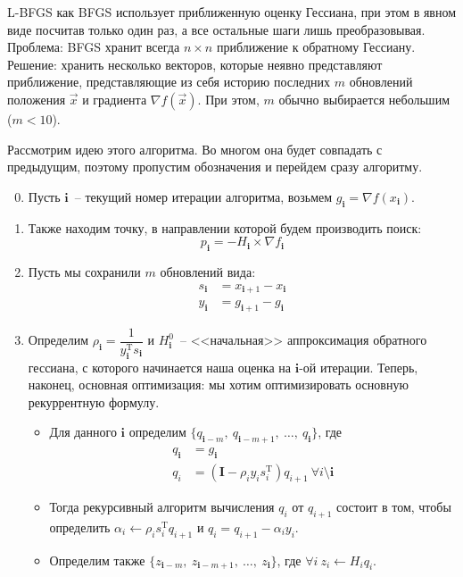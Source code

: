 \documentclass[12pt, a4paper, oneside, final]{article}
\begin{document}
	L-BFGS как BFGS использует приближенную оценку Гессиана, при этом в явном виде посчитав только один раз, а все остальные шаги лишь преобразовывая.
	Проблема: BFGS хранит всегда $n \times n$ приближение к обратному Гессиану.
	Решение: хранить несколько векторов, которые неявно представляют приближение, представляющие из себя историю последних $m$ обновлений положения $\vec{x}$ и градиента $\nabla{f(\vec{x})}$.
	При этом, $m$ обычно выбирается небольшим ($m < 10$).

	Рассмотрим идею этого алгоритма.
	Во многом она будет совпадать с предыдущим, поэтому пропустим обозначения и перейдем сразу алгоритму.
	\begin{enumerate}[1)]
		\setcounter{enumi}{-1}
		\item Пусть $\mathbf{i}$~-- текущий номер итерации алгоритма, возьмем $g_{\mathbf{i}} = \nabla{f(x_{\mathbf{i}})}$.
		\item Также находим точку, в направлении которой будем производить поиск:
		\[
			p_{\mathbf{i}} = -H_{\mathbf{i}} \times \nabla{f_{\mathbf{i}}}
		\]
		\item Пусть мы сохранили $m$ обновлений вида:
		\begin{align*}
			s_{\mathbf{i}} &= x_{\mathbf{i} + 1} - x_{\mathbf{i}} \\
			y_{\mathbf{i}} &= g_{\mathbf{i} + 1} - g_{\mathbf{i}}
		\end{align*}
		\item Определим $\rho_{\mathbf{i}} = \dfrac{1}{y_{\mathbf{i}}^{\mathrm{T}}s_{\mathbf{i}}}$ и $H_{\mathbf{i}}^{0}$~-- <<начальная>> аппроксимация обратного гессиана, с которого начинается наша оценка на $\mathbf{i}$-ой итерации.
		Теперь, наконец, основная оптимизация: мы хотим оптимизировать основную рекуррентную формулу.
		\begin{itemize}
			\item Для данного $\mathbf{i}$ определим $\{q_{\mathbf{i} - m}, ~ q_{\mathbf{i} - m + 1}, ~ \ldots, ~ q_{\mathbf{i}}\}$, где
			\begin{align*}
				q_{\mathbf{i}} &= g_{\mathbf{i}} \\
				q_{i} &= \left(\mathbf{I} - \rho_{i}y_{i}s_{i}^{\mathrm{T}}\right)q_{i + 1} ~ \forall i \setminus \mathbf{i}
			\end{align*}
			\item Тогда рекурсивный алгоритм вычисления $q_{i}$ от $q_{i + 1}$ состоит в том, чтобы определить $\alpha_{i} \gets \rho_{i}s_{i}^{\mathrm{T}}q_{i + 1}$ и $q_{i} = q_{i + 1} - \alpha_{i}y_{i}$.
			\item Определим также $\{z_{\mathbf{i} - m}, ~ z_{\mathbf{i} - m + 1}, ~ \ldots, ~ z_{\mathbf{i}}\}$, где $\forall i ~ z_{i} \gets H_{i}q_{i}$.

\end{itemize}
\end{enumerate}
\end{document}
